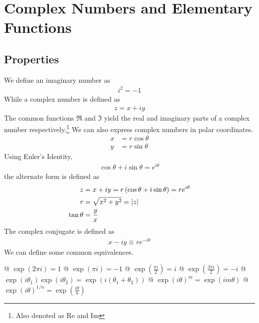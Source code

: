 \section{Complex Numbers and Elementary Functions}
    \subsection{Properties}
    We define an imaginary number as
    \begin{align*} i^2 = -1 \end{align*}
    While a complex number is defined as
    \begin{align*} z = x + iy \end{align*}
    The common functions $\Re$ and $\Im$ yield the real and imaginary parts
    of a complex number respectively.\footnote{Also denoted as Re and Im} We
    can also express complex numbers in polar coordinates.
    \begin{align*}
        x &= r \cos \theta\\
        y &= r \sin \theta
    \end{align*}
    Using Euler's Identity,
    \begin{align*}
        \cos \theta + i \sin \theta = e^{i\theta}
    \end{align*}
    the alternate form is defined as
    \begin{align*}
        z &= x + iy = r \left(\cos \theta + i \sin \theta\right) = r e^{i\theta}\\
        r &= \sqrt{x^2 + y^2} = \left\lvert z \right\rvert\\
        \tan \theta &= \frac{y}{x}
    \end{align*}
    The complex conjugate is defined as
    \begin{align*}
        x - iy \equiv r e^{-i\theta}
    \end{align*}
    We can define some common equivalences.
    \begin{easylist}[itemize]
        @ $\exp{\left(2\pi i \right)} = 1$
        @ $\exp{\left(\pi i\right)} = -1$
        @ $\exp{\left(\frac{\pi i}{2}\right)} = i$
        @ $\exp{\left(\frac{3\pi i}{2}\right)} = -i$
        @ $\exp{\left(i\theta_1\right)}\exp{\left(i\theta_2\right)} =
        \exp{\left(i\left(\theta_1 + \theta_2\right)\right)}$
        @ $\exp{\left(i\theta\right)}^m = \exp\left(im\theta\right)$
        @ $\exp{\left(i\theta\right)}^{1/n} =
        \exp\left(\frac{i\theta}{n}\right)$
    \end{easylist}

